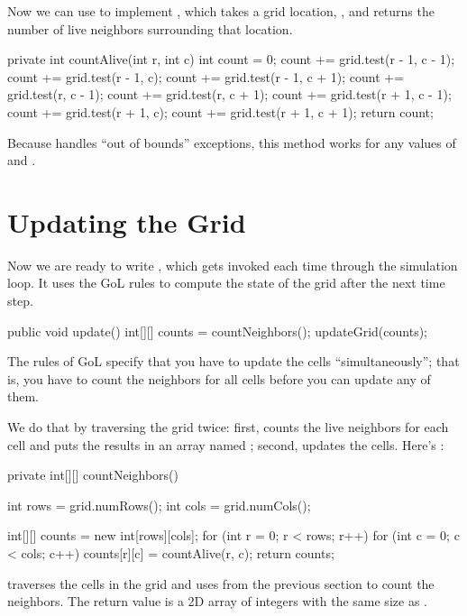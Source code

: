 Now we can use  to implement , which takes a grid location, , and returns the number of live neighbors surrounding that location.

\begin{code}
private int countAlive(int r, int c) {
    int count = 0;
    count += grid.test(r - 1, c - 1);
    count += grid.test(r - 1, c);
    count += grid.test(r - 1, c + 1);
    count += grid.test(r, c - 1);
    count += grid.test(r, c + 1);
    count += grid.test(r + 1, c - 1);
    count += grid.test(r + 1, c);
    count += grid.test(r + 1, c + 1);
    return count;
}
\end{code}

Because  handles ``out of bounds'' exceptions, this method works for any values of  and .


\section{Updating the Grid}
\label{sec:update}

Now we are ready to write , which gets invoked each time through the simulation loop.
It uses the GoL rules to compute the state of the grid after the next time step.

\begin{code}
public void update() {
    int[][] counts = countNeighbors();
    updateGrid(counts);
}
\end{code}

The rules of GoL specify that you have to update the cells ``simultaneously''; that is, you have to count the neighbors for all cells before you can update any of them.

We do that by traversing the grid twice: first,  counts the live neighbors for each cell and puts the results in an array named ; second,  updates the cells.
Here's :

\begin{code}
private int[][] countNeighbors() {
    int rows = grid.numRows();
    int cols = grid.numCols();

    int[][] counts = new int[rows][cols];
    for (int r = 0; r < rows; r++) {
        for (int c = 0; c < cols; c++) {
            counts[r][c] = countAlive(r, c);
        }
    }
    return counts;
}
\end{code}

 traverses the cells in the grid and uses  from the previous section to count the neighbors.
The return value is a 2D array of integers with the same size as .

